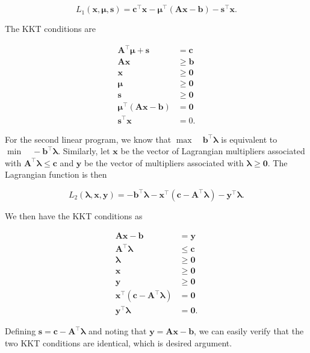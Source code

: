 \begin{equation*}
	L_{1}(\boldsymbol{x}, \boldsymbol{\mu}, \boldsymbol{s})=\boldsymbol{c}^{\top} \boldsymbol{x}-\boldsymbol{\mu}^{\top}(\boldsymbol{A} \boldsymbol{x}-\boldsymbol{b})-\boldsymbol{s}^{\top} \boldsymbol{x} .
\end{equation*}

The KKT conditions are

\[
	\begin{aligned}
		\boldsymbol{A}^{\top} \boldsymbol{\mu}+\boldsymbol{s} & = \boldsymbol{c} \\
		\boldsymbol{A} \boldsymbol{x} & \geq \boldsymbol{b} \\
		\boldsymbol{x} & \geq \boldsymbol{0} \\
		\boldsymbol{\mu} & \geq \boldsymbol{0} \\
		\boldsymbol{s} & \geq \boldsymbol{0} \\
		\boldsymbol{\mu}^{\top}(\boldsymbol{A} \boldsymbol{x}-\boldsymbol{b}) & =\boldsymbol{0} \\
		\boldsymbol{s}^{\top} \boldsymbol{x} & =0 .
	\end{aligned}
\]

For the second linear program, we know that \(\max \quad \boldsymbol{b}^{\top} \boldsymbol{\lambda}\) is equivalent to \(\min \quad -\boldsymbol{b}^{\top} \boldsymbol{\lambda}\). Similarly, let \(\boldsymbol{x}\) be the vector of Lagrangian multipliers associated with \(\boldsymbol{A}^{\top} \boldsymbol{\lambda} \leq \boldsymbol{c}\) and \(\boldsymbol{y}\) be the vector of multipliers associated with \(\boldsymbol{\lambda} \geq \boldsymbol{0}\). The Lagrangian function is then

\[
	L_{2}(\boldsymbol{\lambda}, \boldsymbol{x}, \boldsymbol{y})=-\boldsymbol{b}^{\top} \boldsymbol{\lambda}-\boldsymbol{x}^{\top}\left(\boldsymbol{c}-\boldsymbol{A}^{\top} \boldsymbol{\lambda} \right)-\boldsymbol{y}^{\top} \boldsymbol{\lambda} .
\]

We then have the KKT conditions as

\[
	\begin{aligned}
		\boldsymbol{A} \boldsymbol{x} - \boldsymbol{b} & = \boldsymbol{y} \\
		\boldsymbol{A}^{\top} \boldsymbol{\lambda} & \leq \boldsymbol{c} \\
		\boldsymbol{\lambda} & \geq \boldsymbol{0} \\
		\boldsymbol{x} & \geq \boldsymbol{0} \\
		\boldsymbol{y} & \geq \boldsymbol{0} \\
		\boldsymbol{x}^{\top}\left(\boldsymbol{c}-\boldsymbol{A}^{\top} \boldsymbol{\lambda} \right) & = \boldsymbol{0} \\
		\boldsymbol{y}^{\top} \boldsymbol{\lambda} & = \boldsymbol{0} .
	\end{aligned}
\]

Defining \(\boldsymbol{s}=\boldsymbol{c}-\boldsymbol{A}^{\top} \boldsymbol{\lambda}\) and noting that \(\boldsymbol{y}=\boldsymbol{A} \boldsymbol{x}-\boldsymbol{b}\), we can easily verify that the two KKT conditions are identical, which is desired argument.
